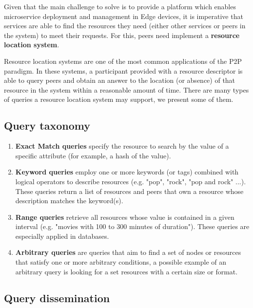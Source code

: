 

Given that the main challenge to solve is to provide a platform which enables microservice deployment and management in Edge devices, it is imperative that services are able to find the resources they need (either other services or peers in the system) to meet their requests. For this, peers need implement a \textbf{resource location system}.

Resource location systems are one of the most common applications of the P2P paradigm. In these systems, a participant provided with a resource descriptor is able to query peers and obtain an answer to the location (or absence) of that resource in the system within a reasonable amount of time. There are many types of queries a resource location system may support, we present some of them.

\subsection{Query taxonomy}

\begin{enumerate}
    \item \textbf{Exact Match queries} specify the resource to search by the value of a specific attribute (for example, a hash of the value).

    \item \textbf{Keyword queries} employ one or more keywords (or tags) combined with logical operators to describe resources (e.g. "pop", "rock", "pop and rock" ...). These queries return a list of resources and peers that own a resource whose description matches the keyword(s).
    
    \item \textbf{Range queries} retrieve all resources whose value is contained in a given interval (e.g. "movies with 100 to 300 minutes of duration"). These queries are especially applied in databases.
    
    \item \textbf{Arbitrary queries} are queries that aim to find a set of nodes or resources that satisfy one or more arbitrary conditions, a possible example of an arbitrary query is looking for a set resources with a certain size or format.
\end{enumerate}

\subsection{Query dissemination}

